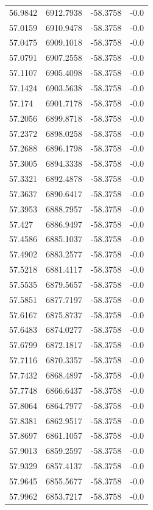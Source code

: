 \begin{table}[H]
\begin{tabular}{llll}
56.9842 & 6912.7938 & -58.3758 & -0.0 \\
57.0159 & 6910.9478 & -58.3758 & -0.0 \\
57.0475 & 6909.1018 & -58.3758 & -0.0 \\
57.0791 & 6907.2558 & -58.3758 & -0.0 \\
57.1107 & 6905.4098 & -58.3758 & -0.0 \\
57.1424 & 6903.5638 & -58.3758 & -0.0 \\
57.174 & 6901.7178 & -58.3758 & -0.0 \\
57.2056 & 6899.8718 & -58.3758 & -0.0 \\
57.2372 & 6898.0258 & -58.3758 & -0.0 \\
57.2688 & 6896.1798 & -58.3758 & -0.0 \\
57.3005 & 6894.3338 & -58.3758 & -0.0 \\
57.3321 & 6892.4878 & -58.3758 & -0.0 \\
57.3637 & 6890.6417 & -58.3758 & -0.0 \\
57.3953 & 6888.7957 & -58.3758 & -0.0 \\
57.427 & 6886.9497 & -58.3758 & -0.0 \\
57.4586 & 6885.1037 & -58.3758 & -0.0 \\
57.4902 & 6883.2577 & -58.3758 & -0.0 \\
57.5218 & 6881.4117 & -58.3758 & -0.0 \\
57.5535 & 6879.5657 & -58.3758 & -0.0 \\
57.5851 & 6877.7197 & -58.3758 & -0.0 \\
57.6167 & 6875.8737 & -58.3758 & -0.0 \\
57.6483 & 6874.0277 & -58.3758 & -0.0 \\
57.6799 & 6872.1817 & -58.3758 & -0.0 \\
57.7116 & 6870.3357 & -58.3758 & -0.0 \\
57.7432 & 6868.4897 & -58.3758 & -0.0 \\
57.7748 & 6866.6437 & -58.3758 & -0.0 \\
57.8064 & 6864.7977 & -58.3758 & -0.0 \\
57.8381 & 6862.9517 & -58.3758 & -0.0 \\
57.8697 & 6861.1057 & -58.3758 & -0.0 \\
57.9013 & 6859.2597 & -58.3758 & -0.0 \\
57.9329 & 6857.4137 & -58.3758 & -0.0 \\
57.9645 & 6855.5677 & -58.3758 & -0.0 \\
57.9962 & 6853.7217 & -58.3758 & -0.0 \\

\end{tabular}
\end{table}
